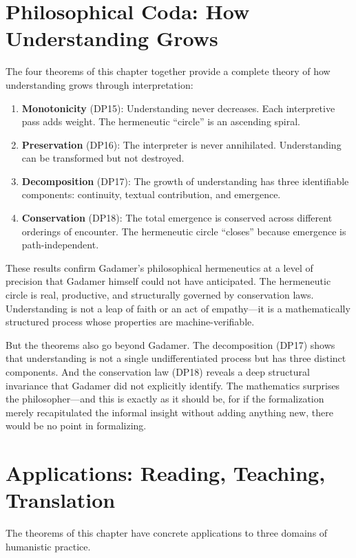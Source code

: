 \section{Philosophical Coda: How Understanding Grows}

The four theorems of this chapter together provide a complete theory of
how understanding grows through interpretation:

\begin{enumerate}
\item \textbf{Monotonicity} (DP15): Understanding never decreases. Each
interpretive pass adds weight. The hermeneutic ``circle'' is an
ascending spiral.
\item \textbf{Preservation} (DP16): The interpreter is never
annihilated. Understanding can be transformed but not destroyed.
\item \textbf{Decomposition} (DP17): The growth of understanding has
three identifiable components: continuity, textual contribution, and
emergence.
\item \textbf{Conservation} (DP18): The total emergence is conserved
across different orderings of encounter. The hermeneutic circle
``closes'' because emergence is path-independent.
\end{enumerate}

These results confirm Gadamer's philosophical hermeneutics at a level
of precision that Gadamer himself could not have anticipated. The
hermeneutic circle is real, productive, and structurally governed by
conservation laws. Understanding is not a leap of faith or an act of
empathy---it is a mathematically structured process whose properties
are machine-verifiable.

But the theorems also go beyond Gadamer. The decomposition (DP17) shows
that understanding is not a single undifferentiated process but has three
distinct components. And the conservation law (DP18) reveals a deep
structural invariance that Gadamer did not explicitly identify. The
mathematics surprises the philosopher---and this is exactly as it
should be, for if the formalization merely recapitulated the informal
insight without adding anything new, there would be no point in
formalizing.

\section{Applications: Reading, Teaching, Translation}

The theorems of this chapter have concrete applications to three domains
of humanistic practice.

